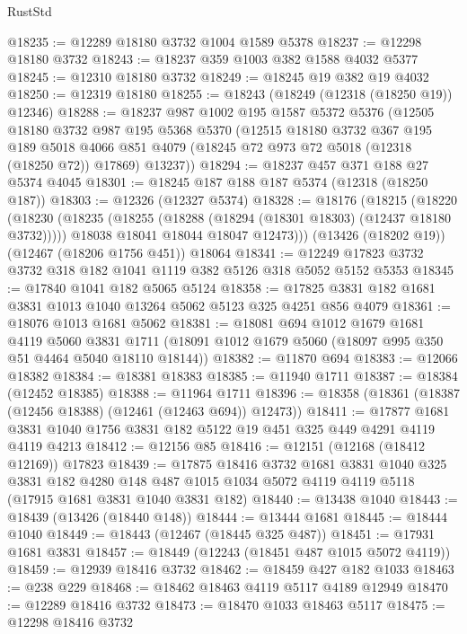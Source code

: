 \begin{lexlean}{RustStd}
\begin{coremodule}
@18235 := @12289 @18180 @3732 @1004 @1589 @5378
@18237 := @12298 @18180 @3732
@18243 := @18237 @359 @1003 @382 @1588 @4032 @5377
@18245 := @12310 @18180 @3732
@18249 := @18245 @19 @382 @19 @4032
@18250 := @12319 @18180
@18255 := @18243 (@18249 (@12318 (@18250 @19)) @12346)
@18288 := @18237
    @987
    @1002
    @195
    @1587
    @5372
    @5376
    (@12505
      @18180
      @3732
      @987
      @195
      @5368
      @5370
      (@12515
        @18180
        @3732
        @367
        @195
        @189
        @5018
        @4066
        @851
        @4079
        (@18245 @72 @973 @72 @5018 (@12318 (@18250 @72)) @17869)
        @13237))
@18294 := @18237 @457 @371 @188 @27 @5374 @4045
@18301 := @18245 @187 @188 @187 @5374 (@12318 (@18250 @187))
@18303 := @12326 (@12327 @5374)
@18328 := @18176
    (@18215
      (@18220
        (@18230
          (@18235 (@18255 (@18288 (@18294 (@18301 @18303) (@12437 @18180 @3732)))))
          @18038
          @18041
          @18044
          @18047
          @12473)))
    (@13426 (@18202 @19))
    (@12467 (@18206 @1756 @451))
    @18064
@18341 := @12249 @17823 @3732 @3732 @318 @182 @1041 @1119 @382 @5126 @318 @5052 @5152 @5353
@18345 := @17840 @1041 @182 @5065 @5124
@18358 := @17825 @3831 @182 @1681 @3831 @1013 @1040 @13264 @5062 @5123 @325 @4251 @856 @4079
@18361 := @18076 @1013 @1681 @5062
@18381 := @18081
    @694
    @1012
    @1679
    @1681
    @4119
    @5060
    @3831
    @1711
    (@18091 @1012 @1679 @5060 (@18097 @995 @350 @51 @4464 @5040 @18110 @18144))
@18382 := @11870 @694
@18383 := @12066 @18382
@18384 := @18381 @18383
@18385 := @11940 @1711
@18387 := @18384 (@12452 @18385)
@18388 := @11964 @1711
@18396 := @18358 (@18361 (@18387 (@12456 @18388) (@12461 (@12463 @694)) @12473))
@18411 := @17877 @1681 @3831 @1040 @1756 @3831 @182 @5122 @19 @451 @325 @449 @4291 @4119 @4119 @4213
@18412 := @12156 @85
@18416 := @12151 (@12168 (@18412 @12169)) @17823
@18439 := @17875
    @18416
    @3732
    @1681
    @3831
    @1040
    @325
    @3831
    @182
    @4280
    @148
    @487
    @1015
    @1034
    @5072
    @4119
    @4119
    @5118
    (@17915 @1681 @3831 @1040 @3831 @182)
@18440 := @13438 @1040
@18443 := @18439 (@13426 (@18440 @148))
@18444 := @13444 @1681
@18445 := @18444 @1040
@18449 := @18443 (@12467 (@18445 @325 @487))
@18451 := @17931 @1681 @3831
@18457 := @18449 (@12243 (@18451 @487 @1015 @5072 @4119))
@18459 := @12939 @18416 @3732
@18462 := @18459 @427 @182 @1033
@18463 := @238 @229
@18468 := @18462 @18463 @4119 @5117 @4189 @12949
@18470 := @12289 @18416 @3732
@18473 := @18470 @1033 @18463 @5117
@18475 := @12298 @18416 @3732

\end{coremodule}
\end{lexlean}
